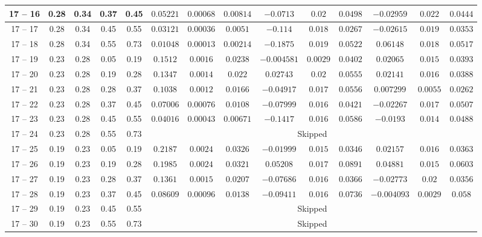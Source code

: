 \begin{longtable}{|*{14}{c|}}
\hline
17 -- 16 & 0.28 & 0.34 & 0.37 & 0.45 & $0.05221$ & $0.00068$ & $0.00814$ & $-0.0713$ & $0.02$ & $0.0498$ & $-0.02959$ & $0.022$ & $0.0444$ \\
\hline
17 -- 17 & 0.28 & 0.34 & 0.45 & 0.55 & $0.03121$ & $0.00036$ & $0.0051$ & $-0.114$ & $0.018$ & $0.0267$ & $-0.02615$ & $0.019$ & $0.0353$ \\
\hline
17 -- 18 & 0.28 & 0.34 & 0.55 & 0.73 & $0.01048$ & $0.00013$ & $0.00214$ & $-0.1875$ & $0.019$ & $0.0522$ & $0.06148$ & $0.018$ & $0.0517$ \\
\hline
17 -- 19 & 0.23 & 0.28 & 0.05 & 0.19 & $0.1512$ & $0.0016$ & $0.0238$ & $-0.004581$ & $0.0029$ & $0.0402$ & $0.02065$ & $0.015$ & $0.0393$ \\
\hline
17 -- 20 & 0.23 & 0.28 & 0.19 & 0.28 & $0.1347$ & $0.0014$ & $0.022$ & $0.02743$ & $0.02$ & $0.0555$ & $0.02141$ & $0.016$ & $0.0388$ \\
\hline
17 -- 21 & 0.23 & 0.28 & 0.28 & 0.37 & $0.1038$ & $0.0012$ & $0.0166$ & $-0.04917$ & $0.017$ & $0.0556$ & $0.007299$ & $0.0055$ & $0.0262$ \\
\hline
17 -- 22 & 0.23 & 0.28 & 0.37 & 0.45 & $0.07006$ & $0.00076$ & $0.0108$ & $-0.07999$ & $0.016$ & $0.0421$ & $-0.02267$ & $0.017$ & $0.0507$ \\
\hline
17 -- 23 & 0.23 & 0.28 & 0.45 & 0.55 & $0.04016$ & $0.00043$ & $0.00671$ & $-0.1417$ & $0.016$ & $0.0586$ & $-0.0193$ & $0.014$ & $0.0488$ \\
\hline
17 -- 24 & 0.23 & 0.28 & 0.55 & 0.73 & \multicolumn{9}{c|}{Skipped} \\
\hline
17 -- 25 & 0.19 & 0.23 & 0.05 & 0.19 & $0.2187$ & $0.0024$ & $0.0326$ & $-0.01999$ & $0.015$ & $0.0346$ & $0.02157$ & $0.016$ & $0.0363$ \\
\hline
17 -- 26 & 0.19 & 0.23 & 0.19 & 0.28 & $0.1985$ & $0.0024$ & $0.0321$ & $0.05208$ & $0.017$ & $0.0891$ & $0.04881$ & $0.015$ & $0.0603$ \\
\hline
17 -- 27 & 0.19 & 0.23 & 0.28 & 0.37 & $0.1361$ & $0.0015$ & $0.0207$ & $-0.07686$ & $0.016$ & $0.0366$ & $-0.02773$ & $0.02$ & $0.0356$ \\
\hline
17 -- 28 & 0.19 & 0.23 & 0.37 & 0.45 & $0.08609$ & $0.00096$ & $0.0138$ & $-0.09411$ & $0.016$ & $0.0736$ & $-0.004093$ & $0.0029$ & $0.058$ \\
\hline
17 -- 29 & 0.19 & 0.23 & 0.45 & 0.55 & \multicolumn{9}{c|}{Skipped} \\
\hline
17 -- 30 & 0.19 & 0.23 & 0.55 & 0.73 & \multicolumn{9}{c|}{Skipped} \\
\hline
\end{longtable}
\endgroup
\normalsize
